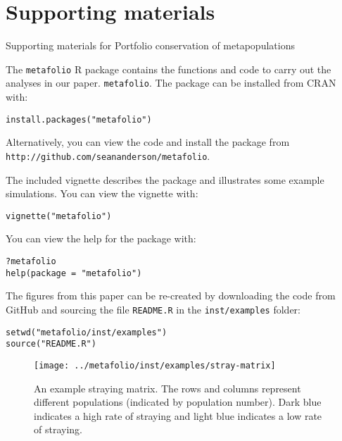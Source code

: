 \chapter{Supporting materials}{Supporting materials for Portfolio conservation of metapopulations}


The \texttt{metafolio} \textsf{R} package contains the functions and
code to carry out the analyses in our paper. \texttt{metafolio}. The
package can be installed from CRAN with:

\begin{verbatim}
install.packages("metafolio")
\end{verbatim}

Alternatively, you can view the code and install the package from
\texttt{http://github.com/seananderson/metafolio}.

The included vignette describes the package and illustrates some example
simulations. You can view the vignette with:

\begin{verbatim}
vignette("metafolio")
\end{verbatim}

You can view the help for the package with:

\begin{verbatim}
?metafolio
help(package = "metafolio")
\end{verbatim}

The figures from this paper can be re-created by downloading the code
from GitHub and sourcing the file \texttt{README.R} in the
\texttt{inst/examples} folder:

\begin{verbatim}
setwd("metafolio/inst/examples")
source("README.R")
\end{verbatim}

\clearpage







\begin{figure}[htbp]
\centering
\texttt{[image: ../metafolio/inst/examples/stray-matrix]}
\caption{An example straying matrix. The rows and columns represent different
populations (indicated by population number). Dark blue indicates a high rate
of straying and light blue indicates a low rate of straying.}
\label{f:stray}
\end{figure}

